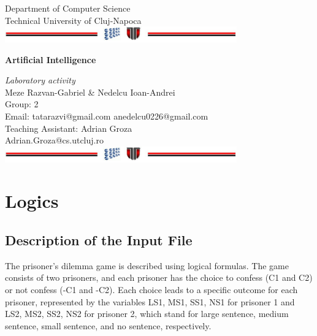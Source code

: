 \documentclass[a4paper,12pt]{report}
\begin{document}
\vspace{-5cm}
\begin{center}
Department of Computer Science\\
Technical University of Cluj-Napoca\\
\includegraphics[width=10cm]{fig/footer}
\end{center}
\vspace{1cm}
\begin{center}
\begin{Large}
 \textbf{Artificial Intelligence}\\
\end{Large}
\textit{Laboratory activity}\\
\vspace{3cm}
Meze Razvan-Gabriel \& Nedelcu Ioan-Andrei\\
Group: 2\\
Email: tatarazvi@gmail.com anedelcu0226@gmail.com\\
\vspace{12cm}
Teaching Assistant: Adrian Groza\\
Adrian.Groza@cs.utcluj.ro\\
\vspace{1cm}
\includegraphics[width=10cm]{fig/footer}
\end{center}

\tableofcontents

% 


\chapter{Logics}
\section{Description of the Input File}

The prisoner's dilemma game is described using logical formulas. The game consists of two prisoners, and each prisoner has the choice to confess (C1 and C2) or not confess (-C1 and -C2). Each choice leads to a specific outcome for each prisoner, represented by the variables LS1, MS1, SS1, NS1 for prisoner 1 and LS2, MS2, SS2, NS2 for prisoner 2, which stand for large sentence, medium sentence, small sentence, and no sentence, respectively.
\end{document}
